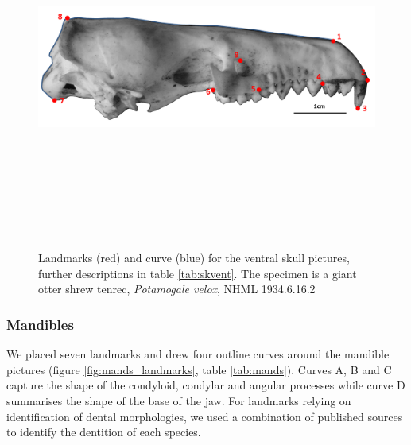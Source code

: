 \documentclass[12pt,a4paper]{article}
\begin{document}
	\begin{figure}[H] 
 	\centering
  	\includegraphics[width=12cm, height=12cm, keepaspectratio=true]
  	{figures/sklat_landmarks_pot_vel.png}
    \caption {Landmarks (red) and curve (blue) for the ventral skull pictures, further descriptions in table \ref{tab:skvent}. The specimen is a giant otter shrew tenrec, \textit{Potamogale velox}, NHML 1934.6.16.2}
  	\label{fig:sklat_landmarks}
  	\end{figure}


	\begin{table}[h]
	\caption{Descriptions of the landmarks (points) and curves (semilandmarks) for the skulls in lateral view (see Figure \ref{fig:sklat_landmarks}.} 
	
	\label{tab:sklat}
	\end{table}
\subsubsection{Mandibles}
	
	We placed seven landmarks and drew four outline curves around the mandible pictures (figure \ref{fig:mands_landmarks}, table \ref{tab:mands}). Curves A, B and C capture the shape of the condyloid, condylar and angular processes while curve D summarises the shape of the base of the jaw. For landmarks relying on identification of dental morphologies, we used a combination of published sources \citep{Repenning1967, Eisenberg1969, Nowak1983, MacPhee1987, KnoxJones1992, Davis1997, Querouil2001, Nagorsen2002, Wilson2005, Goodman2006, Karatas2007, Hoffmann2008, Asher2008, Lin2010,  Muldoon2009, ADW2013} to identify the dentition of each species.  
\end{document}
